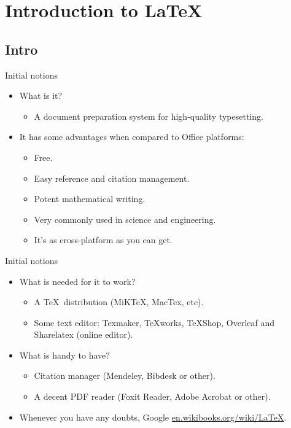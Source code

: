 \documentclass[usenames,dvipsnames,aspectratio=169]{beamer}
\newcommand{\aitem}{\item[$\cdot$]}
\newcommand{\bitem}{\item[-]}
\begin{document}
\section{Introduction to \LaTeX}
\subsection{Intro}
\begin{frame}[t]{Initial notions}
\begin{itemize}
\aitem What is it?
\begin{itemize}
\bitem A document preparation system for high-quality typesetting. 
\end{itemize}
\aitem It has some advantages when compared to Office platforms:
\begin{itemize}
\bitem Free.
\bitem Easy reference and citation management.
\bitem Potent mathematical writing.
\bitem Very commonly used in science and engineering.
\bitem It's as cross-platform as you can get.
\end{itemize}
\end{itemize}
\end{frame}


\begin{frame}[t]{Initial notions}
\begin{itemize}
\aitem What is needed for it to work?
\begin{itemize}
\bitem A \TeX~distribution (MiKTeX, MacTex, etc).
\bitem Some text editor: Texmaker, TeXworks, TeXShop, Overleaf and Sharelatex (online editor).
\end{itemize}
\aitem What is handy to have?
\begin{itemize}
\bitem Citation manager (Mendeley, Bibdesk or other).
\bitem A decent PDF reader (Foxit Reader, Adobe Acrobat or other).
\end{itemize}
\aitem Whenever you have any doubts, Google \textcolor{blue}{\url{en.wikibooks.org/wiki/LaTeX}}.
\end{itemize}
\end{frame}

\end{document}

